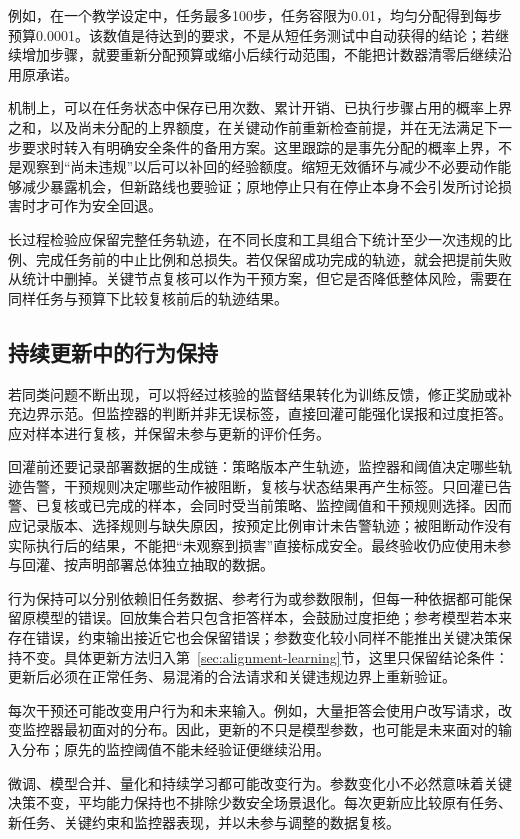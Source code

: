 例如，在一个教学设定中，任务最多100步，任务容限为0.01，均匀分配得到每步预算0.0001。该数值是待达到的要求，不是从短任务测试中自动获得的结论；若继续增加步骤，就要重新分配预算或缩小后续行动范围，不能把计数器清零后继续沿用原承诺。

机制上，可以在任务状态中保存已用次数、累计开销、已执行步骤占用的概率上界之和，以及尚未分配的上界额度，在关键动作前重新检查前提，并在无法满足下一步要求时转入有明确安全条件的备用方案。这里跟踪的是事先分配的概率上界，不是观察到“尚未违规”以后可以补回的经验额度。缩短无效循环与减少不必要动作能够减少暴露机会，但新路线也要验证；原地停止只有在停止本身不会引发所讨论损害时才可作为安全回退。

长过程检验应保留完整任务轨迹，在不同长度和工具组合下统计至少一次违规的比例、完成任务前的中止比例和总损失。若仅保留成功完成的轨迹，就会把提前失败从统计中删掉。关键节点复核可以作为干预方案，但它是否降低整体风险，需要在同样任务与预算下比较复核前后的轨迹结果。

\subsection{持续更新中的行为保持}
\label{sec:alignment-generalization-update}

若同类问题不断出现，可以将经过核验的监督结果转化为训练反馈，修正奖励或补充边界示范。但监控器的判断并非无误标签，直接回灌可能强化误报和过度拒答。应对样本进行复核，并保留未参与更新的评价任务。

回灌前还要记录部署数据的生成链：策略版本产生轨迹，监控器和阈值决定哪些轨迹告警，干预规则决定哪些动作被阻断，复核与状态结果再产生标签。只回灌已告警、已复核或已完成的样本，会同时受当前策略、监控阈值和干预规则选择。因而应记录版本、选择规则与缺失原因，按预定比例审计未告警轨迹；被阻断动作没有实际执行后的结果，不能把“未观察到损害”直接标成安全。最终验收仍应使用未参与回灌、按声明部署总体独立抽取的数据。

行为保持可以分别依赖旧任务数据、参考行为或参数限制，但每一种依据都可能保留原模型的错误。回放集合若只包含拒答样本，会鼓励过度拒绝；参考模型若本来存在错误，约束输出接近它也会保留错误；参数变化较小同样不能推出关键决策保持不变。具体更新方法归入第~\ref{sec:alignment-learning}节，这里只保留结论条件：更新后必须在正常任务、易混淆的合法请求和关键违规边界上重新验证。

每次干预还可能改变用户行为和未来输入。例如，大量拒答会使用户改写请求，改变监控器最初面对的分布。因此，更新的不只是模型参数，也可能是未来面对的输入分布；原先的监控阈值不能未经验证便继续沿用。

微调、模型合并、量化和持续学习都可能改变行为。参数变化小不必然意味着关键决策不变，平均能力保持也不排除少数安全场景退化。每次更新应比较原有任务、新任务、关键约束和监控器表现，并以未参与调整的数据复核。

